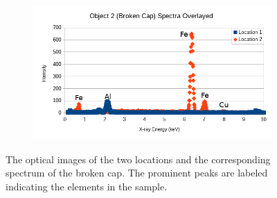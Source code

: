\documentclass[10pt]{IEEEtran}
\begin{document}
\begin{center}
\begin{figure}[!hbtt]
    ~ %
    \begin{subfigure}[!hbt]{0.41\textwidth}
        \includegraphics[width=\textwidth]{Object2}
        \label{fig:Object2}
    \end{subfigure}
    \caption{The optical images of the two locations and the corresponding spectrum of the broken cap. The prominent peaks are labeled indicating the elements in the sample.}
    \label{fig:objects2}
\end{figure}


\end{center}
\end{document}
